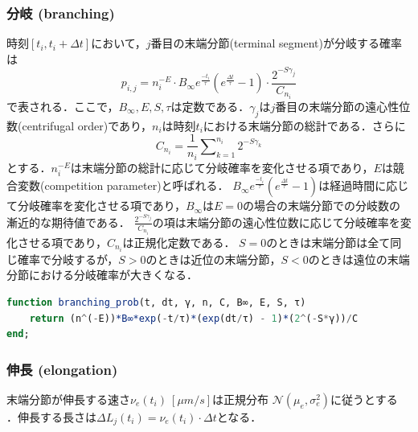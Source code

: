 \subsubsection{分岐 (branching)}
時刻$[t_i, t_i + \Delta t]$において，$j$番目の末端分節(terminal segment)が分岐する確率は
\begin{equation}
p_{i,j} = n_i^{-E}\cdot B_{\infty} e^{\frac{-t_i}{\tau}} \left(e^{\frac{\Delta t}{\tau}} - 1\right)\cdot \frac{2^{-S\gamma_j}}{C_{n_i}}
\end{equation}
で表される．ここで，$B_{\infty}, E, S, \tau$は定数である．$\gamma_j$は$j$番目の末端分節の遠心性位数(centrifugal order)であり，$n_i$は時刻$t_i$における末端分節の総計である．さらに
\begin{equation}
{C_{n_i}} = \frac{1}{n_i}\sum\nolimits_{k = 1}^{n_i} {{2^{ - S{\gamma_k}}}}
\end{equation}
とする．$n_i^{-E}$は末端分節の総計に応じて分岐確率を変化させる項であり，$E$は競合変数(competition parameter)と呼ばれる．
$B_{\infty} e^{\frac{-t_i}{\tau}} \left(e^{\frac{\Delta t}{\tau}} - 1\right)$は経過時間に応じて分岐確率を変化させる項であり，$B_{\infty}$は$E=0$の場合の末端分節での分岐数の漸近的な期待値である．
$\frac{2^{-S\gamma_j}}{C_{n_i}}$の項は末端分節の遠心性位数に応じて分岐確率を変化させる項であり，$C_{n_i}$は正規化定数である．
$S=0$のときは末端分節は全て同じ確率で分岐するが，$S>0$のときは近位の末端分節，$S<0$のときは遠位の末端分節における分岐確率が大きくなる．
\begin{lstlisting}[language=julia]
function branching_prob(t, dt, γ, n, C, B∞, E, S, τ)
    return (n^(-E))*B∞*exp(-t/τ)*(exp(dt/τ) - 1)*(2^(-S*γ))/C
end;
\end{lstlisting}
\subsubsection{伸長 (elongation) }
末端分節が伸長する速さ$\nu_e(t_i)\ [\mu m/s]$は正規分布 $\mathcal{N}(\mu_e, \sigma_e^2)$に従うとする \citep{Van_Ooyen2014-fb}．伸長する長さは$\Delta L_j(t_i)=\nu_e(t_i) \cdot \Delta t$となる．
